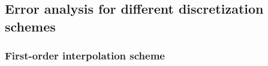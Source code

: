 \documentclass[journal]{IEEEtran}
\theoremstyle{plain}
\theoremstyle{definition}
\theoremstyle{definition}
\begin{document}



\subsection{Error analysis for different discretization schemes}
\label{sec:discr-scheme-error}

\subsubsection{First-order interpolation scheme}
\end{document}
